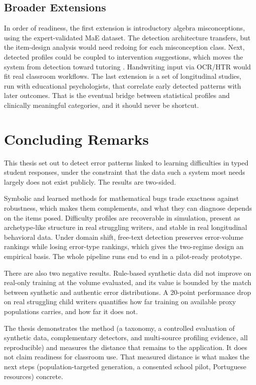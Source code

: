 \subsection{Broader Extensions}
\label{sec:concl_future_broader}

In order of readiness, the first extension is introductory algebra misconceptions, using the expert-validated MaE dataset. The detection architecture transfers, but the item-design analysis would need redoing for each misconception class. Next, detected profiles could be coupled to intervention suggestions, which moves the system from detection toward tutoring \parencite{VanLehn2006}. Handwriting input via OCR/HTR would fit real classroom workflows. The last extension is a set of longitudinal studies, run with educational psychologists, that correlate early detected patterns with later outcomes. That is the eventual bridge between statistical profiles and clinically meaningful categories, and it should never be shortcut.

\section{Concluding Remarks}
\label{sec:concl_final}

This thesis set out to detect error patterns linked to learning difficulties in typed student responses, under the constraint that the data such a system most needs largely does not exist publicly. The results are two-sided.

Symbolic and learned methods for mathematical bugs trade exactness against robustness, which makes them complements, and what they can diagnose depends on the items posed. Difficulty profiles are recoverable in simulation, present as archetype-like structure in real struggling writers, and stable in real longitudinal behavioral data. Under domain shift, free-text detection preserves error-volume rankings while losing error-type rankings, which gives the two-regime design an empirical basis. The whole pipeline runs end to end in a pilot-ready prototype.

There are also two negative results. Rule-based synthetic data did not improve on real-only training at the volume evaluated, and its value is bounded by the match between synthetic and authentic error distributions. A 20-point performance drop on real struggling child writers quantifies how far training on available proxy populations carries, and how far it does not.

The thesis demonstrates the method (a taxonomy, a controlled evaluation of synthetic data, complementary detectors, and multi-source profiling evidence, all reproducible) and measures the distance that remains to the application. It does not claim readiness for classroom use. That measured distance is what makes the next steps (population-targeted generation, a consented school pilot, Portuguese resources) concrete.
